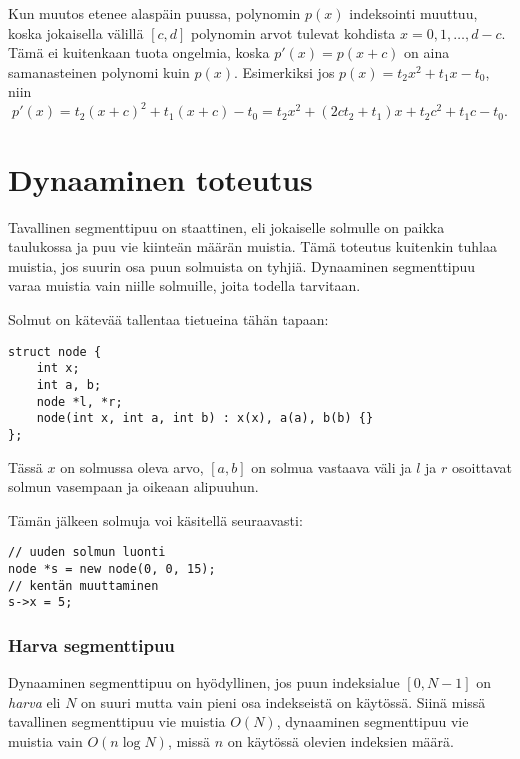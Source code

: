 Kun muutos etenee alaspäin puussa,
polynomin $p(x)$ indeksointi muuttuu,
koska jokaisella välillä $[c,d]$
polynomin arvot tulevat kohdista $x=0,1,\ldots,d-c$.
Tämä ei kuitenkaan tuota ongelmia,
koska $p'(x)=p(x+c)$ on aina
samanasteinen polynomi kuin $p(x)$.
Esimerkiksi jos $p(x)=t_2 x^2+t_1 x-t_0$, niin
\[p'(x)=t_2(x+c)^2+t_1(x+c)-t_0=t_2 x^2 + (2ct_2+t_1)x+t_2c^2+t_1c-t_0.\]

\section{Dynaaminen toteutus}


Tavallinen segmenttipuu on staattinen,
eli jokaiselle solmulle on paikka taulukossa
ja puu vie kiinteän määrän muistia.
Tämä toteutus kuitenkin tuhlaa muistia,
jos suurin osa puun solmuista on tyhjiä.
Dynaaminen segmenttipuu varaa muistia vain
niille solmuille, joita todella tarvitaan.

Solmut on kätevää tallentaa tietueina tähän tapaan:

\begin{lstlisting}
struct node {
    int x;
    int a, b;
    node *l, *r;
    node(int x, int a, int b) : x(x), a(a), b(b) {}
};
\end{lstlisting}
Tässä $x$ on solmussa oleva arvo,
$[a,b]$ on solmua vastaava väli
ja $l$ ja $r$ osoittavat
solmun vasempaan ja oikeaan alipuuhun.

Tämän jälkeen solmuja voi käsitellä seuraavasti:

\begin{lstlisting}
// uuden solmun luonti
node *s = new node(0, 0, 15);
// kentän muuttaminen
s->x = 5;
\end{lstlisting}

\subsubsection{Harva segmenttipuu}


Dynaaminen segmenttipuu on hyödyllinen,
jos puun indeksialue $[0,N-1]$ on \textit{harva}
eli $N$ on suuri mutta vain
pieni osa indekseistä on käytössä.
Siinä missä tavallinen segmenttipuu 
vie muistia $O(N)$,
dynaaminen segmenttipuu vie muistia
vain $O(n \log N)$, missä $n$ on
käytössä olevien indeksien määrä.

